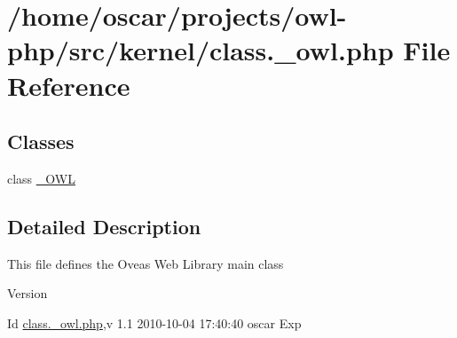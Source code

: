 \section{/home/oscar/projects/owl-\/php/src/kernel/class.\_\-owl.php File Reference}
\label{class_8__owl_8php}
\subsection*{Classes}
\begin{DoxyCompactItemize}
\item 
class \hyperlink{class__OWL}{\_\-OWL}
\end{DoxyCompactItemize}


\subsection{Detailed Description}
This file defines the Oveas Web Library main class \begin{DoxyVersion}{Version}

\end{DoxyVersion}
\begin{DoxyParagraph}{Id}
\hyperlink{class_8__owl_8php}{class.\_\-owl.php},v 1.1 2010-\/10-\/04 17:40:40 oscar Exp 
\end{DoxyParagraph}
